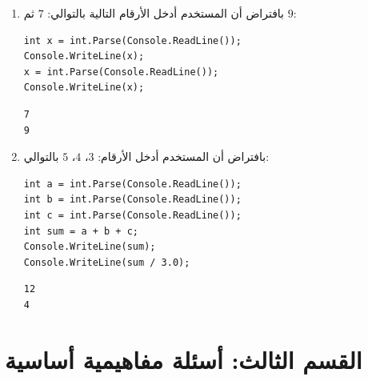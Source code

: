 \documentclass[14pt]{extarticle}
\begin{document}
\begin{enumerate}[resume, itemsep=2em]
\item
بافتراض أن المستخدم أدخل الأرقام التالية بالتوالي: $7$ ثم $9$:
\begin{english}
\begin{verbatim}
int x = int.Parse(Console.ReadLine());
Console.WriteLine(x);
x = int.Parse(Console.ReadLine());
Console.WriteLine(x);
\end{verbatim}
\end{english}
\ifwithsols
\begin{boxSolution}
\begin{english}
\begin{verbatim}
7
9
\end{verbatim}
\end{english}
\end{boxSolution}
\fi

\item
بافتراض أن المستخدم أدخل الأرقام: $3$، $4$، $5$ بالتوالي:
\begin{english}
\begin{verbatim}
int a = int.Parse(Console.ReadLine());
int b = int.Parse(Console.ReadLine());
int c = int.Parse(Console.ReadLine());
int sum = a + b + c;
Console.WriteLine(sum);
Console.WriteLine(sum / 3.0);
\end{verbatim}
\end{english}
\ifwithsols
\begin{boxSolution}
\begin{english}
\begin{verbatim}
12
4
\end{verbatim}
\end{english}
\end{boxSolution}
\fi

\end{enumerate}

\clearpage

\section*{القسم الثالث: أسئلة مفاهيمية أساسية}
\end{document}
